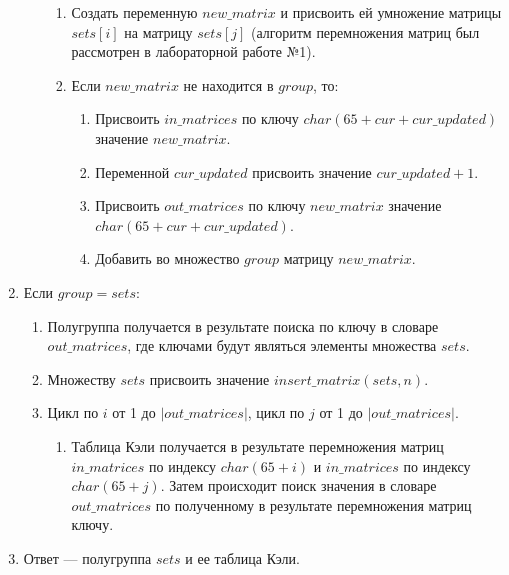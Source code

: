 \documentclass[bachelor, och, labwork]{shiza}
\begin{document}
\begin{enumerate}
\begin{enumerate}
                \begin{enumerate}
                    \item Создать переменную $new\_matrix$ и присвоить ей умножение
                    матрицы $sets[i]$ на матрицу $sets[j]$ (алгоритм перемножения
                    матриц был рассмотрен в лабораторной работе №1).
                    \item Если $new\_matrix$ не находится в $group$, то:
                        \begin{enumerate}
                            \item Присвоить $in\_matrices$ по ключу $char(65 + cur + cur\_updated)$ 
                            значение $new\_matrix$.
                            \item Переменной $cur\_updated$ присвоить значение $cur\_updated+1$.
                            \item Присвоить $out\_matrices$ по ключу $new\_matrix$ 
                            значение $char(65 + cur + cur\_updated)$.
                            \item Добавить во множество $group$ матрицу $new\_matrix$.
                        \end{enumerate}
                \end{enumerate}
        \end{enumerate}
    \item Если $group = sets$:
        \begin{enumerate}
            \item Полугруппа получается в результате поиска по ключу в словаре $out\_matrices$,
            где ключами будут являться элементы множества $sets$.
            \item Множеству $sets$ присвоить значение $insert\_matrix(sets, n)$.
            \item Цикл по $i$ от 1 до $|out\_matrices|$, цикл по $j$ от 1 до $|out\_matrices|$.
                \begin{enumerate}
                    \item Таблица Кэли получается в результате перемножения матриц $in\_matrices$
                    по индексу $char(65 + i)$ и $in\_matrices$ по индексу $char(65 + j)$.
                    Затем происходит поиск значения в словаре $out\_matrices$ по полученному
                    в результате перемножения матриц ключу. 
                \end{enumerate}
        \end{enumerate}
    \item Ответ --- полугруппа $sets$ и ее таблица Кэли.
\end{enumerate}
\end{document}
